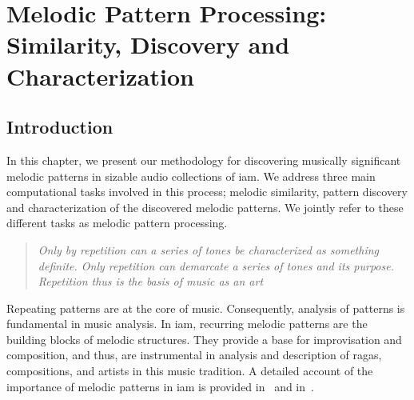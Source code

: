 
\chapter{Melodic Pattern Processing: Similarity, Discovery and Characterization}
\label{chap:melodic_pattern_processing}

\section{Introduction}
\label{sec:patterns_introduction}

In this chapter, we present our methodology for discovering musically significant melodic patterns in sizable audio collections of \gls{iam}. We address three main computational tasks involved in this process; melodic similarity, pattern discovery and characterization of the discovered melodic patterns. We jointly refer to these different tasks as melodic pattern processing.

\blockquote[\cite{schenker1980harmony}]{\textit{Only by repetition can a series of tones be characterized as something definite. Only repetition can demarcate a series of tones and its purpose. Repetition thus is the basis of music as an art}}

Repeating patterns are at the core of music. Consequently, analysis of patterns is fundamental in music analysis.  In \gls{iam}, recurring melodic patterns are the building blocks of melodic structures. They provide a base for improvisation and composition, and thus, are instrumental in analysis and description of \glspl{raga}, compositions, and artists in this music tradition. A detailed account of the importance of melodic patterns in \gls{iam} is provided in~ and in~. 



